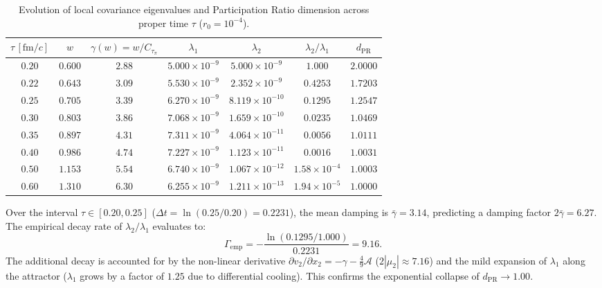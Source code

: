 \documentclass[11pt,a4paper]{article}
\begin{document}
\begin{table}[htbp]
    \centering
    \caption{Evolution of local covariance eigenvalues and Participation Ratio dimension across proper time $\tau$ ($r_0 = 10^{-4}$).}
    \label{tab:test1_results}
    \vspace{0.4em}
    \begin{tabular}{@{}c c c c c c c@{}}
        \toprule
        $\tau\,[\mathrm{fm}/c]$ & $w$ & $\gamma(w) = w/C_{\tau_\pi}$ & $\lambda_1$ & $\lambda_2$ & $\lambda_2/\lambda_1$ & $d_{\mathrm{PR}}$ \\
        \midrule
        $0.20$ & $0.600$ & $2.88$ & $5.000\times 10^{-9}$ & $5.000\times 10^{-9}$ & $1.000$ & $2.0000$ \\
        $0.22$ & $0.643$ & $3.09$ & $5.530\times 10^{-9}$ & $2.352\times 10^{-9}$ & $0.4253$ & $1.7203$ \\
        $0.25$ & $0.705$ & $3.39$ & $6.270\times 10^{-9}$ & $8.119\times 10^{-10}$ & $0.1295$ & $1.2547$ \\
        $0.30$ & $0.803$ & $3.86$ & $7.068\times 10^{-9}$ & $1.659\times 10^{-10}$ & $0.0235$ & $1.0469$ \\
        $0.35$ & $0.897$ & $4.31$ & $7.311\times 10^{-9}$ & $4.064\times 10^{-11}$ & $0.0056$ & $1.0111$ \\
        $0.40$ & $0.986$ & $4.74$ & $7.227\times 10^{-9}$ & $1.123\times 10^{-11}$ & $0.0016$ & $1.0031$ \\
        $0.50$ & $1.153$ & $5.54$ & $6.740\times 10^{-9}$ & $1.067\times 10^{-12}$ & $1.58\times 10^{-4}$ & $1.0003$ \\
        $0.60$ & $1.310$ & $6.30$ & $6.255\times 10^{-9}$ & $1.211\times 10^{-13}$ & $1.94\times 10^{-5}$ & $1.0000$ \\
        \bottomrule
    \end{tabular}
\end{table}

Over the interval $\tau \in [0.20, 0.25]$ ($\Delta t = \ln(0.25/0.20) = 0.2231$), the mean damping is $\bar{\gamma} = 3.14$, predicting a damping factor $2\bar{\gamma} = 6.27$. The empirical decay rate of $\lambda_2/\lambda_1$ evaluates to:
\begin{equation}
    \Gamma_{\mathrm{emp}} = -\frac{\ln(0.1295 / 1.000)}{0.2231} = 9.16.
\end{equation}
The additional decay is accounted for by the non-linear derivative $\partial v_2/\partial x_2 = -\gamma - \frac{4}{9}\mathcal{A}$ ($2|\mu_2| \approx 7.16$) and the mild expansion of $\lambda_1$ along the attractor ($\lambda_1$ grows by a factor of $1.25$ due to differential cooling). This confirms the exponential collapse of $d_{\mathrm{PR}} \to 1.00$.
\end{document}
